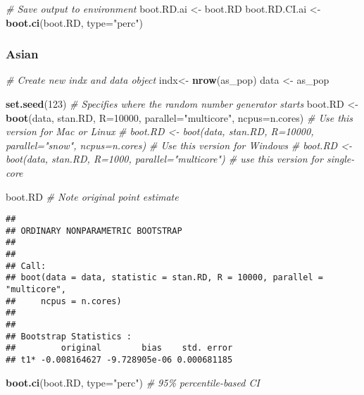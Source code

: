 \documentclass[
]{article}
\newenvironment{Shaded}{\begin{snugshade}}{\end{snugshade}}
\newcommand{\AttributeTok}[1]{\textcolor[rgb]{0.13,0.29,0.53}{#1}}
\newcommand{\CommentTok}[1]{\textcolor[rgb]{0.56,0.35,0.01}{\textit{#1}}}
\newcommand{\DecValTok}[1]{\textcolor[rgb]{0.00,0.00,0.81}{#1}}
\newcommand{\FunctionTok}[1]{\textcolor[rgb]{0.13,0.29,0.53}{\textbf{#1}}}
\newcommand{\NormalTok}[1]{#1}
\newcommand{\OtherTok}[1]{\textcolor[rgb]{0.56,0.35,0.01}{#1}}
\newcommand{\StringTok}[1]{\textcolor[rgb]{0.31,0.60,0.02}{#1}}
\begin{document}
\begin{Shaded}
\begin{Highlighting}[]
\CommentTok{\# Save output to environment}
\NormalTok{boot.RD.ai }\OtherTok{\textless{}{-}}\NormalTok{ boot.RD}
\NormalTok{boot.RD.CI.ai }\OtherTok{\textless{}{-}} \FunctionTok{boot.ci}\NormalTok{(boot.RD, }\AttributeTok{type=}\StringTok{"perc"}\NormalTok{) }
\end{Highlighting}
\end{Shaded}

\subsubsection{Asian}\label{asian}

\begin{Shaded}
\begin{Highlighting}[]
\CommentTok{\# Create new indx and data object }
\NormalTok{indx}\OtherTok{\textless{}{-}} \FunctionTok{nrow}\NormalTok{(as\_pop)}
\NormalTok{data }\OtherTok{\textless{}{-}}\NormalTok{ as\_pop}

\FunctionTok{set.seed}\NormalTok{(}\DecValTok{123}\NormalTok{) }\CommentTok{\# Specifies where the random number generator starts}
\NormalTok{boot.RD }\OtherTok{\textless{}{-}} \FunctionTok{boot}\NormalTok{(data, stan.RD, }\AttributeTok{R=}\DecValTok{10000}\NormalTok{, }\AttributeTok{parallel=}\StringTok{"multicore"}\NormalTok{, }\AttributeTok{ncpus=}\NormalTok{n.cores) }\CommentTok{\# Use this version for Mac or Linux}
\CommentTok{\# boot.RD \textless{}{-} boot(data, stan.RD, R=10000, parallel="snow", ncpus=n.cores) \# Use this version for Windows}
\CommentTok{\# boot.RD \textless{}{-} boot(data, stan.RD, R=1000, parallel="multicore") \# use this version for single{-}core}

\NormalTok{boot.RD }\CommentTok{\# Note original point estimate}
\end{Highlighting}
\end{Shaded}

\begin{verbatim}
## 
## ORDINARY NONPARAMETRIC BOOTSTRAP
## 
## 
## Call:
## boot(data = data, statistic = stan.RD, R = 10000, parallel = "multicore", 
##     ncpus = n.cores)
## 
## 
## Bootstrap Statistics :
##         original        bias    std. error
## t1* -0.008164627 -9.728905e-06 0.000681185
\end{verbatim}

\begin{Shaded}
\begin{Highlighting}[]
\FunctionTok{boot.ci}\NormalTok{(boot.RD, }\AttributeTok{type=}\StringTok{"perc"}\NormalTok{) }\CommentTok{\# 95\% percentile{-}based CI}
\end{Highlighting}
\end{Shaded}
\end{document}
